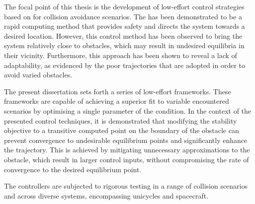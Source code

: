 The focal point of this thesis is the development of low-effort control strategies based on  for collision avoidance scenarios. The  has been demonstrated to be a rapid computing method that provides safety and directs the system towards a desired location. However, this control method has been observed to bring the system relatively close to obstacles, which may result in undesired equilibria in their vicinity. Furthermore, this approach has been shown to reveal a lack of adaptability, as evidenced by the poor trajectories that are adopted in order to avoid varied obstacles.\par
The present dissertation sets forth a series of low-effort  frameworks. These frameworks are capable of achieving a superior fit to variable encountered scenarios by optimising a single parameter of the  condition. In the context of the presented control techniques, it is demonstrated that modifying the stability objective to a transitive computed point on the boundary of the obstacle can prevent convergence to undesirable equilibrium points and significantly enhance the trajectory. This is achieved by mitigating  unnecessary approximations to the obstacle, which result in larger control inputs, without compromising the rate of convergence to the desired equilibrium point. \par
The controllers are subjected to rigorous testing in a range of collision scenarios and across diverse systems, encompassing unicycles and spacecraft.











